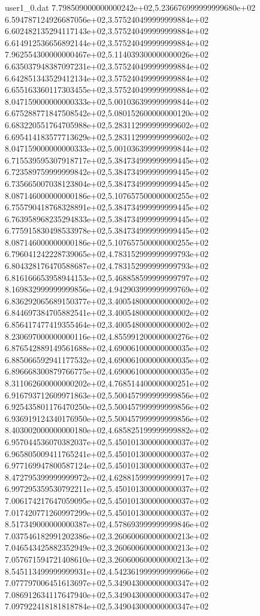 \begin{filecontents}{user1_0.dat}
7.798509000000000242e+02,5.236676999999999680e+02
6.594787124926687056e+02,3.575240499999999884e+02
6.602482135294117143e+02,3.575240499999999884e+02
6.614912536656892144e+02,3.575240499999999884e+02
7.962554300000000467e+02,5.114039300000000026e+02
6.635037948387097231e+02,3.575240499999999884e+02
6.642851343529412134e+02,3.575240499999999884e+02
6.655163360117303455e+02,3.575240499999999884e+02
8.047159000000000333e+02,5.001036399999999844e+02
6.675288771847508542e+02,5.080152600000000120e+02
6.683220551764705988e+02,5.283112999999999602e+02
6.695414183577713629e+02,5.283112999999999602e+02
8.047159000000000333e+02,5.001036399999999844e+02
6.715539595307918717e+02,5.384734999999999445e+02
6.723589759999999842e+02,5.384734999999999445e+02
6.735665007038123804e+02,5.384734999999999445e+02
8.087146000000000186e+02,5.107657500000000255e+02
6.755790418768328891e+02,5.384734999999999445e+02
6.763958968235294833e+02,5.384734999999999445e+02
6.775915830498533978e+02,5.384734999999999445e+02
8.087146000000000186e+02,5.107657500000000255e+02
6.796041242228739065e+02,4.783152999999999793e+02
6.804328176470588687e+02,4.783152999999999793e+02
6.816166653958944153e+02,5.468858599999999797e+02
8.169832999999999856e+02,4.942903999999999769e+02
6.836292065689150377e+02,3.400548000000000002e+02
6.844697384705882541e+02,3.400548000000000002e+02
6.856417477419355464e+02,3.400548000000000002e+02
8.230697000000000116e+02,4.855991200000000276e+02
6.876542889149561688e+02,4.690061000000000035e+02
6.885066592941177532e+02,4.690061000000000035e+02
6.896668300879766775e+02,4.690061000000000035e+02
8.311062600000000202e+02,4.768514400000000251e+02
6.916793712609971863e+02,5.500457999999999856e+02
6.925435801176470250e+02,5.500457999999999856e+02
6.936919124340176950e+02,5.500457999999999856e+02
8.403002000000000180e+02,4.685825199999999882e+02
6.957044536070382037e+02,5.450101300000000037e+02
6.965805009411765241e+02,5.450101300000000037e+02
6.977169947800587124e+02,5.450101300000000037e+02
8.472795399999999972e+02,4.628815999999999917e+02
6.997295359530792211e+02,5.450101300000000037e+02
7.006174217647059095e+02,5.450101300000000037e+02
7.017420771260997299e+02,5.450101300000000037e+02
8.517349000000000387e+02,4.578693999999999846e+02
7.037546182991202386e+02,3.260600600000000213e+02
7.046543425882352949e+02,3.260600600000000213e+02
7.057671594721408610e+02,3.260600600000000213e+02
8.545113499999999931e+02,4.542361999999999966e+02
7.077797006451613697e+02,5.349043000000000347e+02
7.086912634117647940e+02,5.349043000000000347e+02
7.097922418181818784e+02,5.349043000000000347e+02

\end{filecontents}
